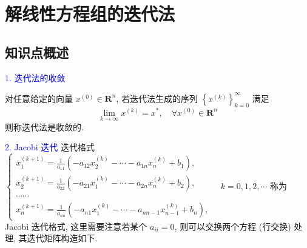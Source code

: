 \newpage
\section{解线性方程组的迭代法}

\subsection{ 知识点概述}

\textcolor{blue}{1. 迭代法的收敛}

对任意给定的向量 $ x^{(0)} \in \mathbf{R}^{n} $, 若迭代法生成的序列 $ \left\{x^{(k)}\right\}_{k=0}^{\infty} $ 满足
$$
\lim _{k \rightarrow \infty} x^{(k)}=x^{*}, \quad \forall x^{(0)} \in \mathbf{R}^{n}
$$
则称迭代法是收敛的.

\textcolor{blue}{2. Jacobi 迭代}
迭代格式
$
\left\{\begin{array}{l} 
x_{1}^{(k+1)}=\frac{1}{a_{11}}\left(-a_{12} x_{2}^{(k)}-\cdots-a_{1 n} x_{n}^{(k)}+b_{1}\right), \\
x_{2}^{(k+1)}=\frac{1}{a_{22}}\left(-a_{21} x_{1}^{(k)}-\cdots-a_{2 n} x_{n}^{(k)}+b_{2}\right),  \\
\cdots \cdots \\
x_{n}^{(k+1)}=\frac{1}{a_{n n}}\left(-a_{n 1} x_{1}^{(k)}-\cdots-a_{n n-1} x_{n-1}^{(k)}+b_{n}\right),
\end{array}\right.\quad k=0,1,2, \cdots
$
称为 Jacobi 迭代格式, 这里需要注意若某个 $ a_{i i}=0 $, 则可以交换两个方程 (行交换) 处理, 其迭代矩阵构造如下.

